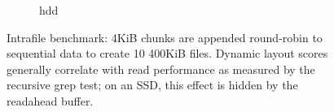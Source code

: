 \begin{figure}[p]
{\begin{subfigure}[t]{\columnwidth}
      \centering
       \begin{rrlayoutplot}{hdd}
	     \end{rrlayoutplot}
           \vspace*{-2em}
       \caption{}
     \end{subfigure}
	\caption{\label{fig:micro:intra} Intrafile benchmark: 4KiB chunks are appended round-robin to sequential data to create 10 400KiB files. Dynamic layout scores generally correlate with read performance as measured by the recursive grep test; on an SSD, this effect is hidden by the readahead buffer. }
	}
\end{figure}
